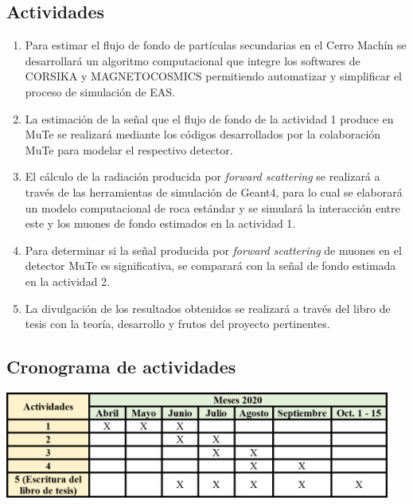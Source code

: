 \documentclass[12pt]{report}
\begin{document}
\subsection*{Actividades}
\begin{enumerate}
    \item Para estimar el flujo de fondo de partículas secundarias en el Cerro Machín se desarrollará un algoritmo computacional que integre los softwares de CORSIKA y MAGNETOCOSMICS permitiendo automatizar y simplificar el proceso de simulación de EAS.
    \item La estimación de la señal que el flujo de fondo de la actividad 1 produce en MuTe se realizará mediante los códigos desarrollados por la colaboración MuTe para modelar el respectivo detector.
    \item El cálculo de la radiación producida por \textit{forward scattering} se realizará a través de las herramientas de simulación de Geant4, para lo cual se elaborará un modelo computacional de roca estándar y se simulará la interacción entre este y los muones de fondo estimados en la actividad 1.
    \item Para determinar si la señal producida por \textit{forward scattering} de muones en el detector MuTe es significativa, se comparará con la señal de fondo estimada en la actividad 2.
    \item La divulgación de los resultados obtenidos se realizará a través del libro de tesis con la teoría, desarrollo y frutos del proyecto pertinentes.
\end{enumerate}

\subsection*{Cronograma de actividades}
\begin{center}
    \includegraphics[width=0.95\textwidth]{images/cronograma.png}
\end{center}






\printbibliography
\end{document}
